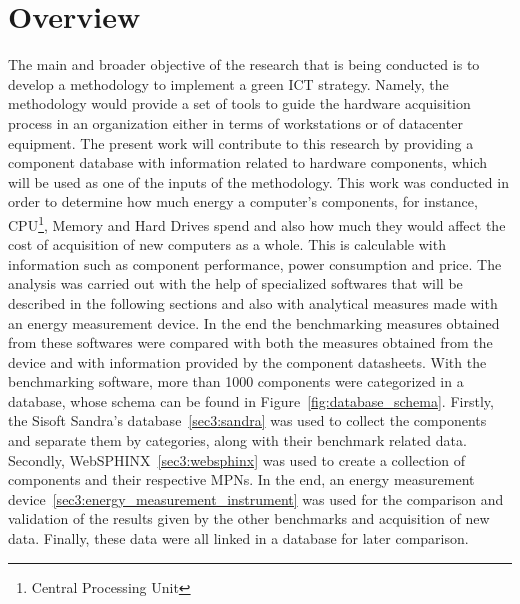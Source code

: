 \section{Overview} \label{sec3:overview}
    The main and broader objective of the research that is being conducted is to develop a methodology to implement a green ICT strategy. Namely, the methodology would provide a set of tools to guide the hardware acquisition process in an organization either in terms of workstations or of datacenter equipment. The present work will contribute to this research by providing a component database with information related to hardware components, which will be used as one of the inputs of the methodology. This work was conducted in order to determine how much energy a computer's components, for instance, CPU\footnote{Central Processing Unit}, Memory and Hard Drives spend and also how much they would affect the cost of acquisition of new computers as a whole. This is calculable with information such as component performance, power consumption and price. The analysis was carried out with the help of specialized softwares that will be described in the following sections and also with analytical measures made with an energy measurement device. In the end the benchmarking measures obtained from these softwares were compared with both the measures obtained from the device and with information provided by the component datasheets. With the benchmarking software, more than 1000 components were categorized in a database, whose schema can be found in Figure~\ref{fig:database_schema}. Firstly, the Sisoft Sandra's database~\ref{sec3:sandra} was used to collect the components and separate them by categories, along with their benchmark related data. Secondly, WebSPHINX~\ref{sec3:websphinx} was used to create a collection of components and their respective MPNs. In the end, an energy measurement device~\ref{sec3:energy_measurement_instrument} was used for the comparison and validation of the results given by the other benchmarks and acquisition of new data. 
    Finally, these data were all linked in a database for later comparison. 

